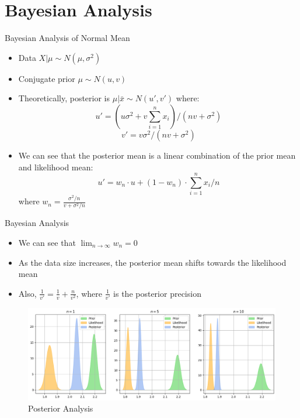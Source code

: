 \section{Bayesian Analysis}

\begin{frame}{Bayesian Analysis of Normal Mean}

\begin{itemize}
  \item Data $X | \mu \sim N(\mu, \sigma^2)$
  \item Conjugate prior $\mu \sim N(u, v)$
  \item Theoretically, posterior is $\mu | \bar{x} \sim N(u', v')$ where:
  \[ u' = \left(u \sigma^2 + v \sum_{i = 1}^{n} x_i\right) / (n v + \sigma^2) \]
  \[ v' = v \sigma^2/(n v + \sigma^2) \]
  \item We can see that the posterior mean is a linear combination of the prior mean and likelihood mean:
  \[ u' = w_n \cdot u + (1 - w_n) \cdot \sum_{i = 1}^{n} x_i / n \]
  where $w_n = \frac{\sigma^2 / n}{v + \sigma^2 / n}$
\end{itemize}
  
\end{frame}

\begin{frame}{Bayesian Analysis}

\begin{itemize}
  \item We can see that $\lim_{n \to \infty} w_n = 0$
  \item As the data size increases, the posterior mean shifts towards the likelihood mean
  \item Also, $\frac{1}{v'} = \frac{1}{v} + \frac{n}{v^2}$, where $\frac{1}{v'}$ is the posterior precision
\end{itemize}

\begin{figure}
  \centering
  \includegraphics[width=\textwidth]{Project1/Report/images/posterior.png}
  \caption{Posterior Analysis}
\end{figure}

\end{frame}

